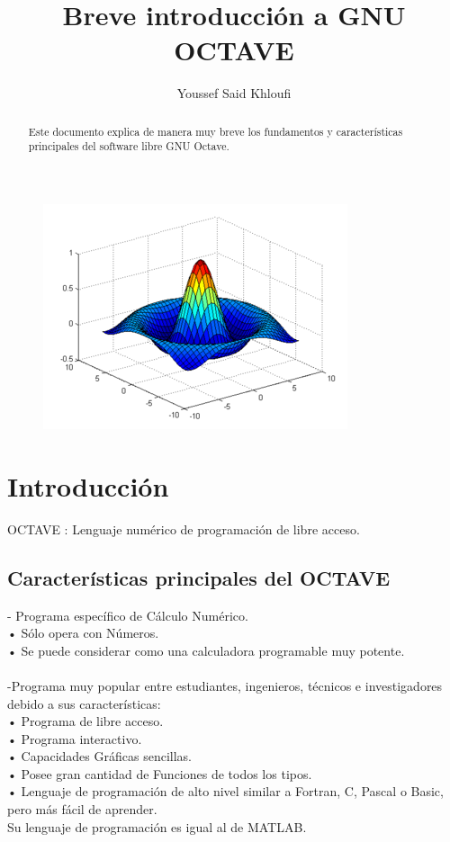 \documentclass[a4,12pt]{article}
\title{Breve introducción a GNU OCTAVE}
\author{Youssef Said Khloufi}
\begin{document}
\maketitle
\bigskip
\bigskip
\bigskip
\begin{figure}[H]
  \centering
    \includegraphics{graficos/octave}
\end{figure}
\newpage

\maketitle

\begin{abstract}
Este documento explica de manera muy breve los fundamentos y características principales del software libre GNU Octave.

\end{abstract}

\tableofcontents
\newpage

\section{Introducción}

OCTAVE : Lenguaje numérico de programación de libre acceso.

\subsection{Características principales del OCTAVE}

- Programa específico de Cálculo Numérico.\\
• Sólo opera con Números.\\
• Se puede considerar como una calculadora programable muy potente.\\
\medskip\\
-Programa muy popular entre estudiantes, ingenieros, técnicos e investigadores debido a sus características:\\
• Programa de libre acceso.\\
• Programa interactivo.\\
• Capacidades Gráficas sencillas.\\
• Posee gran cantidad de Funciones de todos los tipos.\\
• Lenguaje de programación de alto nivel similar a Fortran, C, Pascal o Basic, pero más  fácil de aprender.\\
Su lenguaje de programación es igual al de MATLAB.\\
\end{document}
